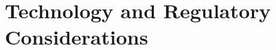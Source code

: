 \documentclass[krantz1,ChapterTOCs]{krantz} %
\theoremstyle{plain}
\theoremstyle{custom}
\numberwithin{ex}{chapter}
\theoremstyle{remark}
\numberwithin{equation}{chapter}
\begin{document}
\part{Technology and Regulatory Considerations}



%
%


\end{document}
